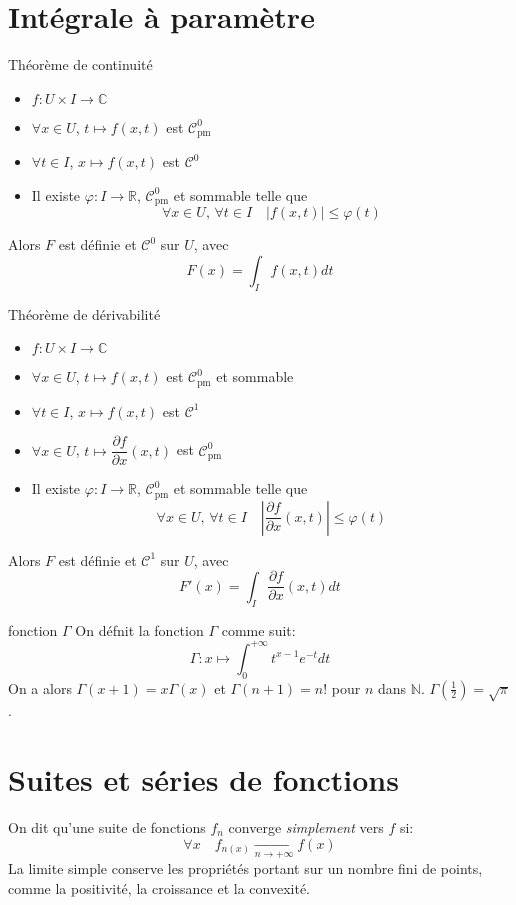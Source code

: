 \documentclass[french, a4paper, 10pt, twocolumn]{article}
\newcommand{\N}{\mathbb{N}}   %
\newcommand{\R}{\mathbb{R}}   %
\newcommand{\C}{\mathbb{C}}   %
\newcommand{\czero}{\mathcal{C}^{0}}
\newcommand{\cun}{\mathcal{C}^{1}}
\renewcommand{\phi}{\varphi}
\begin{document}
\section{Intégrale à paramètre}
\begin{theoreme}{Théorème de continuité}
  \begin{itemize}[label=$\bullet$]
    \item $f:U\times I\rightarrow\C$
    \item $\forall x\in U$, $t\mapsto f(x,t)$ est $\czero_{\text{pm}}$
    \item $\forall t \in I$, $x\mapsto f(x,t)$ est $\czero$
    \item Il existe $\phi : I\rightarrow \R$, $\czero_{\text{pm}}$ et sommable telle que
      \[\forall x\in U,\,\forall t\in I\quad \vert f(x,t)\vert\leqslant\phi(t)\]
  \end{itemize}
  \tcblower
  Alors $F$ est définie et $\czero$ sur $U$, avec
  \[F(x)=\int_{I}f(x,t)dt\]
\end{theoreme}

\begin{theoreme}{Théorème de dérivabilité}
  \begin{itemize}[label=$\bullet$]
    \item $f:U\times I\rightarrow\C$
    \item $\forall x\in U$, $t\mapsto f(x,t)$ est $\czero_{\text{pm}}$ et sommable
    \item $\forall t \in I$, $x\mapsto f(x,t)$ est $\cun$
    \item $\forall x\in U$, $t\mapsto \dfrac{\partial f}{\partial x}(x,t)$ est $\czero_{\text{pm}}$
    \item Il existe $\phi : I\rightarrow \R$, $\czero_{\text{pm}}$ et sommable telle que
      \[\forall x\in U,\,\forall t\in I\quad \left\vert\dfrac{\partial f}{\partial x}(x,t)\right\vert\leqslant\phi(t)\]
  \end{itemize}
  \tcblower
  Alors $F$ est définie et $\cun$ sur $U$, avec
  \[F'(x)=\int_{I}\dfrac{\partial f}{\partial x}(x,t)dt\]
\end{theoreme}

\begin{theoreme}{fonction $\Gamma$}
  On défnit la fonction $\Gamma$ comme suit:
  \[\Gamma:x\mapsto\int_{0}^{+\infty}t^{x-1}e^{-t}dt\]
  On a alors $\Gamma(x+1)=x\Gamma(x)$ et $\Gamma(n+1)=n!$ pour $n$ dans $\N$. $\Gamma(\frac{1}{2})=\sqrt{\pi}$.
\end{theoreme}

\section{Suites et séries de fonctions}
\begin{definition}
  On dit qu'une suite de fonctions $f_{n}$ converge \emph{simplement} vers $f$ si:
  \[\forall x\quad f_{n(x)}\xrightarrow[n\rightarrow +\infty]{} f(x)\]
  La limite simple conserve les propriétés portant sur un nombre fini de points, comme la positivité, la croissance et la convexité.
\end{definition}
\end{document}
